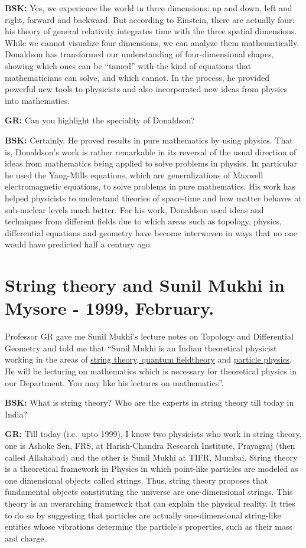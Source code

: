 \textbf{BSK:}  Yes, we experience the world in three dimensions: up and down, left and right, forward and backward. But according to Einstein, there are actually four: his theory of general relativity integrates time with the three spatial dimensions. While we cannot visualize four dimensions, we can analyze them mathematically. Donaldson has transformed our understanding of four-dimensional shapes, showing which ones can be “tamed” with the kind of equations that mathematicians can solve, and which cannot. In the process, he provided powerful new tools to physicists and also incorporated new ideas from physics into mathematics.
\vskip 1pt

\textbf{GR:} Can you highlight the speciality of Donaldson?
\vskip 1pt

\textbf{BSK:} Certainly. He proved results in pure mathematics by using physics. That is, Donaldson’s work is rather remarkable in its reversal of the usual direction of ideas from mathematics being applied to solve problems in physics. In particular he used the Yang-Mills equations, which are generalizations of Maxwell electromagnetic equations, to solve problems in pure mathematics.  His work has helped physicists to understand theories of space-time and how matter behaves at sub-nuclear levels much better. For his work, Donaldson used ideas and techniques from different fields due to which areas such as topology, physics, differential equations and geometry have become interwoven in ways that no one would have predicted half a century ago.

\section*{String theory and Sunil Mukhi in\\ Mysore - 1999, February.}

Professor GR gave me Sunil Mukhi’s lecture notes on Topology and Differential Geometry and told me that “Sunil Mukhi is an Indian theoretical physicist working in the areas of \underline{string theory, quantum field}\break \underline{theory} and \underline{particle physics}. He will be lecturing on mathematics which is necessary for theoretical physics in our Department. You may like his lectures on mathematics”.

\textbf{BSK:} What is string theory? Who are the experts in string theory till today in India?

\textbf{GR:} Till today (i.e.\ upto 1999), I know two physicists who work in string theory, one is Ashoke Sen, FRS, at Harish-Chandra Research Institute, Prayagraj (then called Allahabad) and the other is Sunil Mukhi at TIFR, Mumbai. String theory is a theoretical framework in Physics in which point-like particles are modeled as one dimensional objects called strings. Thus, string theory proposes that fundamental objects constituting the universe are one-dimensional strings. This theory is an overarching framework that can explain the physical reality. It tries to do so by suggesting that particles are actually one-dimensional string-like entities whose vibrations determine the particle’s properties, such as their mass and charge.

